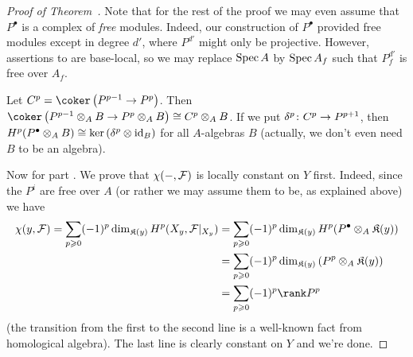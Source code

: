 \documentclass[a4paper,parskip=half,numbers=enddot, DIV=12]{scrreprt}
\renewcommand{\geq}{\geqslant}
\begin{document}
\begin{proof}[Proof of Theorem~]
	Note that for the rest of the proof we may even assume that $P^\bullet$ is a complex of \emph{free} modules. Indeed, our construction of $P^\bullet$ provided free modules except in degree $d'$, where $P^{d'}$ might only be projective. However, assertions  to  are base-local, so we may replace $\operatorname{Spec} A$ by $\operatorname{Spec} A_f$ such that $P_f^{d'}$ is free over $A_f$.%
	
	Let $C^p=\coker\left(P^{p-1}\morphism P^p\right)$. Then $\coker\left(P^{p-1}\otimes_AB\morphism P^p\otimes_AB\right)\cong C^p\otimes_AB$. If we put $\delta^p\colon C^p\morphism P^{p+1}$, then $H^p(P^\bullet\otimes_AB)\cong \ker\left(\delta^p\otimes\operatorname{id}_B\right)$ for all $A$-algebras $B$ (actually, we don't even need $B$ to be an algebra).
	
	Now for part . We prove that $\chi(-,\mathcal{F})$ is locally constant on $Y$ first. Indeed, since the $P^i$ are free over $A$ (or rather we may assume them to be, as explained above) we have
	\begin{align*}
		\chi(y,\Ff)=\sum_{p\geq 0}(-1)^p\dim_{\KK(y)}H^p(X_y,\Ff|_{X_y})&=\sum_{p\geq 0}(-1)^p\dim_{\KK(y)}H^p(P^\bullet\otimes_A\KK(y))\\
		&=\sum_{p\geq 0}(-1)^p\dim_{\KK(y)}\left(P^p\otimes_A\KK(y)\right)\\
		&=\sum_{p\geq 0}(-1)^p\rank P^p
	\end{align*}
	(the transition from the first to the second line is a well-known fact from homological algebra). The last line is clearly constant on $Y$ and we're done.
	

\end{proof}
\end{document}
